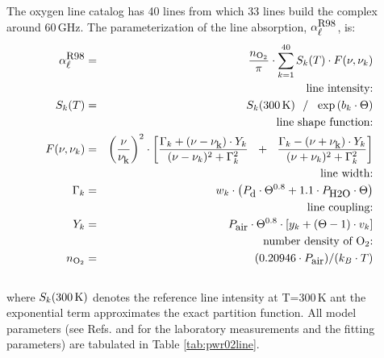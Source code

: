The oxygen line catalog has 40 lines from which 33 lines build the 
complex around 60\,GHz. The parameterization of the line absorption,
$\alpha^{\mbox{\rm \small R98}}_{\mbox{\small $\ell$}}$, is:
\begin{eqnarray}
  \alphapwrl & = & \frac{n_{\rm O_2}}{\pi} \cdot 
                   \sum_{k=1}^{40}{S_k(T) \cdot F(\nu,\nu_k)}\\
%
%
 & & \mbox{line intensity:} \nonumber\\
      \label{eq:PWR93:O2_abs_inten}
      S_k(T) & = & S_k(300\,{\rm K})~~/~~\exp{(b_k \cdot \Theta)}\\
 & & \mbox{line shape function:} \nonumber\\
   F(\nu,\nu_k) & = & \left(\frac{\nu}{\nuk}\right)^2 \cdot 
                   \left[\frac{\Gamma_k+(\nu-\nuk)\cdot Y_k}
                              {(\nu-\nu_k)^2+\Gamma_k^2}~~+~~
                         \frac{\Gamma_k-(\nu+\nuk)\cdot Y_k}
                              {(\nu+\nu_k)^2+\Gamma_k^2}\right] \nonumber\\
 & & \mbox{line width:} \nonumber\\
    \label{eq:PWR93:O2_gamma}
    \Gamma_k & = & w_k \cdot \left(          \pda  \cdot \Theta^{0.8} + 
                                   1.1 \cdot \phzo \cdot \Theta \right)\\
 & & \mbox{line coupling:} \nonumber\\
         \label{eq:PWR93:O2_coupling}
         Y_k & = & \pdair \cdot \Theta^{0.8} \cdot 
                   \left[ y_k + (\Theta-1) \cdot v_k \right]\nonumber\\
 & & \mbox{number density of $\oz$:} \nonumber\\
           n_{\rm O_2} & = & (0.20946 \cdot \pdair)/(k_B \cdot T)\nonumber\\
           \nonumber
\end{eqnarray}
where $S_k(300\,{\rm K})$ denotes the reference line
intensity at T=300\,K ant the exponential term approximates the exact 
partition function. All model parameters (see Refs. \cite{pwr:93} and \cite{liebeetal:92}
for the laboratory measurements and the fitting parameters) are 
tabulated in Table \ref{tab:pwr02line}.
%
